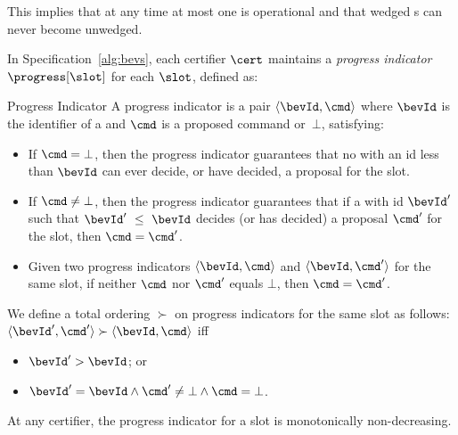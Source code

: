 \noindent
This implies that at any time at most one {\round} is operational and that
wedged {\round}s can never become unwedged.

\begin{comment}
An operational {\round} has exactly one certifier that is designated
as \emph{coordinator}---this certifier handles the recovery part of the protocol (Section~\ref{sec:recovery}).
\end{comment}

\label{sec:progind}

In Specification~\ref{alg:bevs}, each certifier $\cert$ maintains a
\emph{progress indicator} $\progress[\slot]$ for each $\slot$, defined as:

\begin{definition}{Progress Indicator}
A progress indicator is a pair $\langle \bevId, \cmd \rangle$
where $\bevId$ is the identifier of a {\round} and $\cmd$ is a proposed command
or~$\bot$, satisfying:

\begin{itemize}\item If $\cmd = \bot$, then the progress indicator guarantees that no {\round}
with an id less than $\bevId$ can ever decide, or have decided, a proposal
for the slot.
\item If $\cmd \ne \bot$, then the progress indicator guarantees that
if a {\round} with id $\bevId'$ such that $\bevId' ~\le~\bevId$ decides
(or has decided) a proposal $\cmd'$ for the slot, then $\cmd = \cmd'$.
\item Given two progress indicators $\langle \bevId, \cmd \rangle$ and
$\langle \bevId, \cmd' \rangle$ for the same slot, if neither $\cmd$ nor
$\cmd'$ equals $\bot$, then $\cmd = \cmd'$.
\end{itemize}
\end{definition}

\noindent
We define a total ordering $\succ$ on
progress indicators for the same slot as follows:
$\langle \bevId', \cmd' \rangle \succ \langle \bevId, \cmd \rangle$ iff
\begin{itemize}\item $\bevId' > \bevId$; or
\item $\bevId' = \bevId \land \cmd' \ne \bot \land \cmd = \bot$.
\end{itemize}

\noindent
At any certifier, the progress indicator for a slot is monotonically
non-decreasing.





